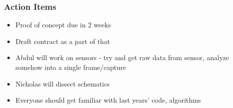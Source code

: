 	\subsubsection*{Action Items}
		\begin{itemize}
			\item Proof of concept due in 2 weeks
			\item Draft contract as a part of that
			\item Abdul will work on sensors - try and get raw data from sensor, analyze somehow into a single frame/capture
			\item Nicholas will dissect schematics
			\item Everyone should get familiar with last years' code, algorithms
		\end{itemize}


